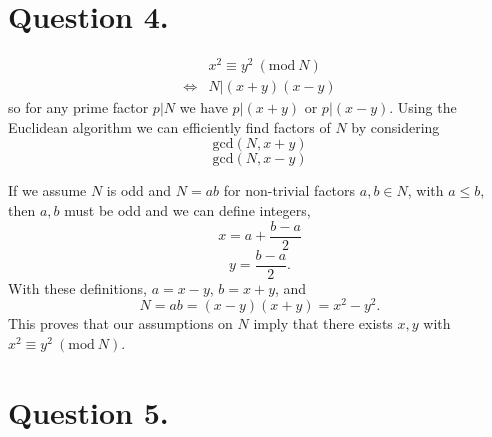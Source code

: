 \documentclass{article}
\newcommand{\N}{\mathbb N}
\begin{document}
 \section*{Question 4.}
 
 \begin{align*}
 & x^2 \equiv y^2 \ (\textrm{mod}\ N) \\
 \iff & N|(x+y)(x-y)
 \end{align*}
 so for any prime factor $p|N$ we have $p|(x+y)$ or $p|(x-y)$.
 Using the Euclidean algorithm we can efficiently find factors of $N$ by considering 
 $$\textrm{gcd}(N,x+y)$$
  $$\textrm{gcd}(N,x-y)$$
 
If we assume $N$ is odd and $N=ab$ for non-trivial factors $a, b\in N$, with $a\le b$, then $a, b$ must be odd and we can define integers,
$$x = a + \frac{b-a} 2$$
$$y = \frac {b-a}2.$$
With these definitions, %
$a = x-y$, $b = x+y$, and
$$N=ab=(x-y)(x+y)=x^2-y^2.$$
This proves that our assumptions on $N$ imply that there exists $x,y$ with $x^2 \equiv y^2 \ (\textrm{mod}\ N)$.

\section*{Question 5.}
\end{document}

